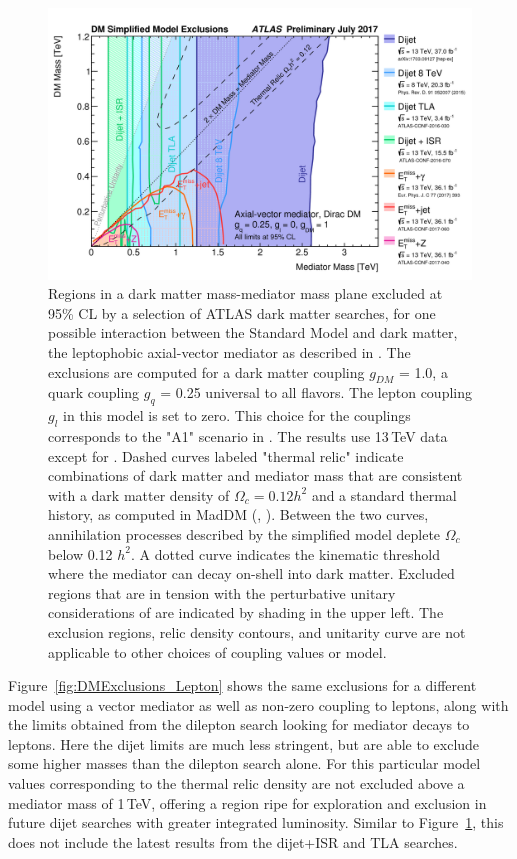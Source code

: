 \begin{figure}[]
	\centering
	\includegraphics[width=\columnwidth]{figures/Conclusion/DMExclusions.png}
	\caption{Regions in a dark matter mass-mediator mass plane excluded at 95\% CL by a selection of ATLAS dark matter searches, for one possible interaction between the Standard Model and dark matter, the leptophobic axial-vector mediator as described in \cite{DMWorkingGroup}. The exclusions are computed for a dark matter coupling $g_{DM}$ = 1.0, a quark coupling $g_q$ = 0.25 universal to all flavors. The lepton coupling $g_l$ in this model is set to zero. This choice for the couplings corresponds to the "A1" scenario in \cite{DMWorkingGroup}. The results use 13\,TeV data except for \cite{DijetResonance8TeV_ATLAS}. Dashed curves labeled "thermal relic" indicate combinations of dark matter and mediator mass that are consistent with a dark matter density of $\Omega_c = 0.12 h^2$ and a standard thermal history, as computed in MadDM (\cite{MadDM}, \cite{DMWorkingGroup}). Between the two curves, annihilation processes described by the simplified model deplete $\Omega_c$ below 0.12 $h^2$. A dotted curve indicates the kinematic threshold where the mediator can decay on-shell into dark matter. Excluded regions that are in tension with the perturbative unitary considerations of \cite{DMUnitarity} are indicated by shading in the upper left. The exclusion regions, relic density contours, and unitarity curve are not applicable to other choices of coupling values or model.}
	\label{fig:DMExclusions}
\end{figure}

Figure~\ref{fig:DMExclusions_Lepton} shows the same exclusions for a different model using a vector mediator as well as non-zero coupling to leptons, along with the limits obtained from the dilepton search looking for mediator decays to leptons.  Here the dijet limits are much less stringent, but are able to exclude some higher masses than the dilepton search alone.  For this particular model values corresponding to the thermal relic density are not excluded above a mediator mass of 1\,TeV, offering a region ripe for exploration and exclusion in future dijet searches with greater integrated luminosity.  Similar to Figure~\ref{fig:DMExclusions}, this does not include the latest results from the dijet+ISR and TLA searches.


